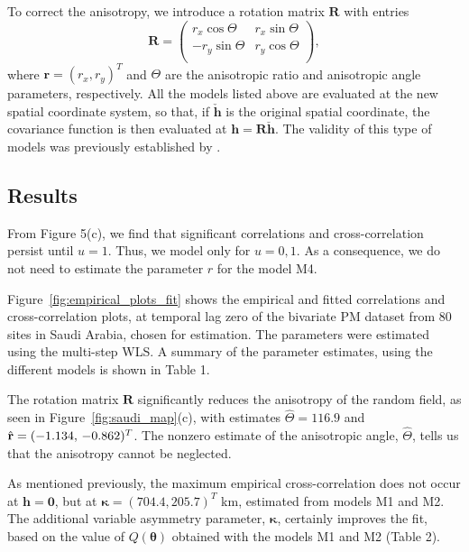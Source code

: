 \documentclass[12pt]{article}
\newcommand{\0}{\mathbf{0}}
\begin{document}
To correct the anisotropy, we introduce a rotation matrix $\mathbf{R}$ with entries 
\begin{equation}
\mathbf{R}=\begin{pmatrix}
r_x\cos\Theta & r_x\sin\Theta \\
-r_y\sin\Theta & r_y\cos\Theta\\
\end{pmatrix},
\end{equation}
where $\mathbf{r}=(r_x,r_y)^T$ and $\Theta$ are the anisotropic ratio and anisotropic angle parameters, respectively. All the models listed above are evaluated at the new spatial coordinate system, so that, if $\check{\mathbf{h}}$ is the original spatial coordinate, the covariance function is then evaluated at $\mathbf{h}=\mathbf{R}\check{\mathbf{h}}$. The validity of this type of models was previously established by \citet{hewer2017matern}.


\subsection{Results}

From Figure 5(c), we find that significant correlations and cross-correlation persist until $u=1$. Thus, we model only for $u=0,1$. As a consequence, we do not need to estimate the parameter $r$ for the model M4.

Figure~\ref{fig:empirical_plots_fit} shows the empirical and fitted correlations and cross-correlation plots, at temporal lag zero of the bivariate PM dataset from 80 sites in Saudi Arabia, chosen for estimation. The parameters were estimated using the multi-step WLS. A summary of the parameter estimates, using the different models is shown in Table 1.

The rotation matrix $\mathbf{R}$ significantly reduces the anisotropy of the random field, as seen in Figure~\ref{fig:saudi_map}(c), with estimates $\hat{\Theta}=116.9$ and $\hat {\bf r}=(-1.134,\, -0.862)^T$.
The nonzero estimate of the anisotropic angle, $\hat{\Theta}$, tells us that the anisotropy cannot be neglected.

As mentioned previously, the maximum empirical cross-correlation does not occur at $\mathbf{h}=\mathbf{0}$, but at $\boldsymbol{\kappa}=(704.4,205.7)^T$ km, estimated from models M1 and M2. The additional variable asymmetry parameter, $\boldsymbol{\kappa}$, certainly improves the fit, based on the value of $Q(\boldsymbol{\theta})$ obtained with the models M1 and M2 (Table 2).
\end{document}
